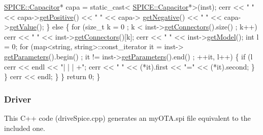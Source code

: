 \begin{DoxyCodeInclude}
                \hyperlink{class_s_p_i_c_e_1_1_capacitor}{SPICE::Capacitor}* capa = \textcolor{keyword}{static\_cast<}
      \hyperlink{class_s_p_i_c_e_1_1_capacitor}{SPICE::Capacitor}*\textcolor{keyword}{>}(inst);
                cerr << \textcolor{stringliteral}{" "} << capa->\hyperlink{class_s_p_i_c_e_1_1_capacitor_a1adb347b9a2c2da556e4417ab0eec0e1}{getPositive}() << \textcolor{stringliteral}{" "} << capa->
      \hyperlink{class_s_p_i_c_e_1_1_capacitor_a8b4ab73ed1d99c533aa22af0a37ebb0d}{getNegative}() << \textcolor{stringliteral}{" "} << capa->\hyperlink{class_s_p_i_c_e_1_1_capacitor_a4c052cb2622c580a250b2c783a436882}{getValue}();
            \} \textcolor{keywordflow}{else} \{
                \textcolor{keywordflow}{for} (\textcolor{keywordtype}{size\_t} k = 0 ; k < inst->\hyperlink{class_s_p_i_c_e_1_1_instance_acce8940edeaa3d79c522006f987e0711}{getConnectors}().size() ; k++)
                    cerr << \textcolor{stringliteral}{" "} << inst->\hyperlink{class_s_p_i_c_e_1_1_instance_acce8940edeaa3d79c522006f987e0711}{getConnectors}()[k];
                cerr << \textcolor{stringliteral}{" "} << inst->\hyperlink{class_s_p_i_c_e_1_1_instance_afc74cbe93df9c473a53db83a325f8f9d}{getModel}();
                \textcolor{keywordtype}{int} l = 0;
                \textcolor{keywordflow}{for} (map<string, string>::const\_iterator it = inst->
      \hyperlink{class_s_p_i_c_e_1_1_instance_aee7d59083b78d31ac5c19ab508da91e0}{getParameters}().begin() ; it != inst->\hyperlink{class_s_p_i_c_e_1_1_instance_aee7d59083b78d31ac5c19ab508da91e0}{getParameters}().end() ; ++it, l++) \{
                    \textcolor{keywordflow}{if} (l%
                        cerr << endl << \textcolor{stringliteral}{"| | | +"};
                    cerr << \textcolor{stringliteral}{" "} << (*it).first << \textcolor{stringliteral}{"="} << (*it).second;
                \}
            \}
            cerr << endl;
        \}
    \}
    \textcolor{keywordflow}{return} 0;
\}

\end{DoxyCodeInclude}
\hypertarget{spice_spiceDriveC}{}\subsubsection{Driver}\label{spice_spiceDriveC}
This C++ code ({\ttfamily drive\-Spice.\-cpp}) generates an my\-O\-T\-A.\-spi file equivalent to the included one. 

